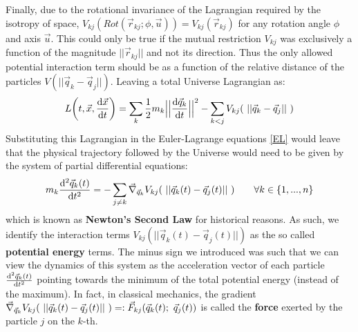 \documentclass[11pt, a4paper]{article} %
\begin{document}
Finally, due to the rotational invariance of the Lagrangian required by the isotropy of space, $V_{kj}(Rot(\vec{r}_{kj};\phi, \vec{u}))=V_{kj}(\vec{r}_{kj})$ for any rotation angle $\phi$ and axis $\vec{u}$. This could only be true if the mutual restriction $V_{kj}$ was exclusively a function of the magnitude $||\vec{r}_{kj}||$ and not its direction. Thus the only allowed potential interaction term should be as a function of the relative distance of the particles $V(||\vec{q}_k-\vec{q}_j||)$. Leaving a total Universe Lagrangian as:\vspace{-0.15cm}
\begin{equation}
L\qty(t, \vec{x}, \dv{\vec{x}}{t})=\sum_{k}\frac{1}{2} m_k\Big|\Big|\dv{\vec{q}_k}{t}\Big|\Big|^2-\sum_{k<j} V_{kj}(\ ||\vec{q}_k-\vec{q}_j||\ )\vspace{-0.15cm}
\end{equation}
Substituting this Lagrangian in the Euler-Lagrange equations \eqref{EL} would leave that the physical trajectory followed by the Universe would need to be given by the system of partial differential equations:
\begin{equation}
m_k \dv[2]{\vec{q}_k(t)}{t} = -\sum_{j\neq k}\vec{\nabla}_{\vec{q}_k} V_{kj}\qty(\ ||\vec{q}_k(t)-\vec{q}_j(t)||\ )\quad\quad \forall k\in\{1,...,n\}\vspace{-0.15cm}
\end{equation}
which is known as {\bf Newton's Second Law} for historical reasons. As such, we identify the interaction terms $V_{kj}(||\vec{q}_k(t)-\vec{q}_j(t)||)$ as the so called {\bf potential energy} terms. The minus sign we introduced was such that we can view the dynamics of this system as the acceleration vector of each particle $\dv[2]{\vec{q}_k(t)}{t} $ pointing towards the minimum of the total potential energy (instead of the maximum). In fact, in classical mechanics, the gradient $\vec{\nabla}_{\vec{q}_k} V_{kj}\qty(\ ||\vec{q}_k(t)-\vec{q}_j(t)||\ )=:\vec{F}_{kj}(\vec{q}_k(t);\ \vec{q}_j(t))$ is called the {\bf force} exerted by the particle $j$ on the $k$-th.



\end{document}
